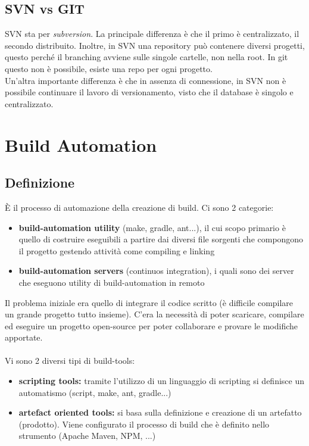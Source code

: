 \documentclass[10pt, a4paper]{article}
\begin{document}
\subsection{SVN vs GIT}
SVN sta per \textit{subversion}. La principale differenza è che il primo è centralizzato, il secondo distribuito.
Inoltre, in SVN una repository può contenere diversi progetti, questo perché il branching avviene sulle singole cartelle, non nella root. In git questo non è possibile, esiste una repo per ogni progetto.\\
Un'altra importante differenza è che in assenza di connessione, in SVN non è possibile continuare il lavoro di versionamento, visto che il database è singolo e centralizzato.


\section{Build Automation}
\subsection{Definizione}
È il processo di automazione della creazione di build. Ci sono 2 categorie:
\begin{itemize}
    \item \textbf{build-automation utility} (make, gradle, ant...), il cui scopo primario è quello di costruire eseguibili a partire dai diversi file sorgenti che compongono il progetto gestendo attività come compiling e linking
    \item \textbf{build-automation servers} (continuos integration), i quali sono dei server che eseguono utility di build-automation in remoto
\end{itemize}
Il problema iniziale era quello di integrare il codice scritto (è difficile compilare un grande progetto tutto insieme). C'era la necessità di poter scaricare, compilare ed eseguire un progetto open-source per poter collaborare e provare le modifiche apportate.\\\\
Vi sono 2 diversi tipi di build-tools:
\begin{itemize}
    \item \textbf{scripting tools:} tramite l'utilizzo di un linguaggio di scripting si definisce un automatismo (script, make, ant, gradle...)
    \item \textbf{artefact oriented tools:} si basa sulla definizione e creazione di un artefatto (prodotto). Viene configurato il processo di build che è definito nello strumento (Apache Maven, NPM, ...)
\end{itemize}
\end{document}
